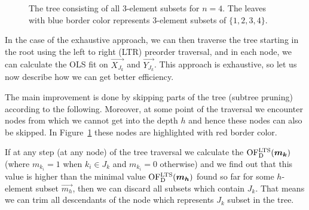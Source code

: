 \begin{figure}[h]
\centering

\begin{center}
\end{center}


\caption{The tree consisting of all $3$-element subsets for $n=4$. The leaves with blue border color represents $3$-element subsets of $\{{1,2,3,4\}}$.}
\label{figure:full:tree}
\end{figure}


In the case of the exhaustive approach, we can then traverse the tree starting in the root using the left to right (LTR) preorder traversal, and in each node, we can calculate the OLS fit on $\vec{ X_{J_k} }$ and $\vec{ Y_{J_k} }$. This approach is exhaustive, so let us now describe how we can get better efficiency. 

The main improvement is done by skipping parts of the tree (subtree pruning) according to the following. Moreover, at some point of the traversal we encounter nodes from which we cannot get into the depth $h$ and hence these nodes can also be skipped. In Figure~\ref{figure:full:tree} these nodes are highlighted with red border color. 

If at any step (at any node) of the tree traversal we calculate the
$\operatorname{OF^{LTS}_D}(\boldsymbol{m_k})$ (where $m_{k_i} = 1$ when $k_i \in J_k$ and $m_{k_i} = 0$ otherwise) and we find out that this value is higher than the minimal value $\operatorname{OF^{LTS}_D}(\boldsymbol{m_h})$ found so far for some $h$-element subset $\vec{m_h}$, then we can discard all subsets which contain $J_k$. That means we can trim all descendants of the node which represents $J_k$ subset in the tree.


